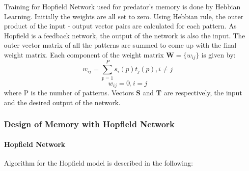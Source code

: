 \documentclass[letterpaper]{article}
\numberwithin{equation}{section}
\begin{document}
Training for Hopfield Network used for predator's memory is done by Hebbian Learning. Initially the weights are all set to zero. Using Hebbian rule, the outer product of the input - output vector pairs are calculated for each pattern. As Hopfield is a feedback network, the output of the network is also the input. The outer vector matrix of all the patterns are summed to come up with the final weight matrix. Each component of the weight matrix \(\textbf{W} = \{w_{ij}\}\) is given by:
\begin{equation}
w_{ij} = \sum_{p=1}^{P} s_i(p) t_j(p), i \neq j
\end{equation}
\[
w_{ij} = 0, i = j
\]
where P is the number of patterns. Vectors \textbf{S} and \textbf{T} are respectively, the input and the desired output of the network.

\subsubsection{Design of Memory with Hopfield Network}

\paragraph{Hopfield Network}

Algorithm for the Hopfield model is described in the following:
\end{document}
